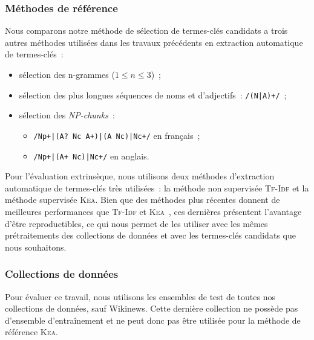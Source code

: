       \subsubsection{Méthodes de référence}
      \label{subsubsec:main:domain_independent_keyphrase_extraction-keyphrase_candidate_selection-evaluation-baselines}
        Nous comparons notre méthode de sélection de termes-clés candidats a
        trois autres méthodes utilisées dans les travaux précédents en
        extraction automatique de termes-clés~:
        \begin{itemize}
          \item{sélection des n-grammes ($1 \leq n \leq 3$)~;}
          \item{sélection des plus longues séquences de noms et d'adjectifs~:
                \texttt{/(N|A)+/}~;}
          \item{sélection des \textit{NP-chunks}~:}
          \begin{itemize}
            \item{\texttt{/Np+|(A? Nc A+)|(A Nc)|Nc+/} en français~;}
            \item{\texttt{/Np+|(A+ Nc)|Nc+/} en anglais.}
          \end{itemize}
        \end{itemize}

        Pour l'évaluation extrinsèque, nous utilisons deux méthodes d'extraction
        automatique de termes-clés très utilisées~: la méthode non supervisée
        \textsc{Tf-Idf} et la méthode supervisée \textsc{Kea}. Bien que des
        méthodes plus récentes donnent de meilleures performances que
        \textsc{Tf-Idf} et \textsc{Kea}~\cite{kim2010semeval}, ces dernières
        présentent l'avantage d'être reproductibles, ce qui nous permet de les
        utiliser avec les mêmes prétraitements des collections de données et
        avec les termes-clés candidats que nous souhaitons.

      \subsubsection{Collections de données}
      \label{subsubsec:main:domain_independent_keyphrase_extraction-keyphrase_candidate_selection-evaluation-evaluation_data}
        Pour évaluer ce travail, nous utilisons les ensembles de test de toutes
        nos collections de données, sauf Wikinews. Cette dernière collection ne
        possède pas d'ensemble d'entraînement et ne peut donc pas être utilisée
        pour la méthode de référence \textsc{Kea}.
      
